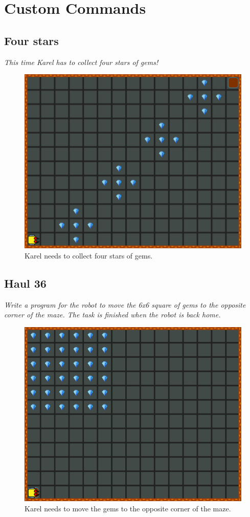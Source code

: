 {{%

\section{Custom Commands}

\subsection{Four stars}

{\em This time Karel has to collect four stars of gems!}\\[-7mm]

\begin{figure}[!ht]
\begin{center}
\includegraphics[height=0.4\textwidth]{img/f01.png}
\end{center}
\vspace{-4mm}
\caption{Karel needs to collect four stars of gems.}
\label{fig:f01}
\end{figure}



\subsection{Haul 36}

{\em Write a program for the robot to move the 6x6 square of gems to the 
opposite corner of the maze. The task is finished when the robot is back home.}

\begin{figure}[!ht]
\begin{center}
\includegraphics[height=0.4\textwidth]{img/f02.png}
\end{center}
\vspace{-4mm}
\caption{Karel needs to move the gems to the opposite corner of the maze.}
\label{fig:f02}
\end{figure}
\vspace{-1cm}



}}
